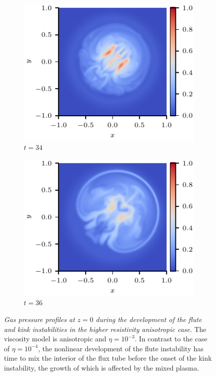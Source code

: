 \documentclass[fleqn,usenatbib]{mnras}
\newcommand{\rev}[1]{{\color{red} {#1}}}
\newcommand{\mycaption}[2]{\caption[#1]{\emph{#1} #2}}
\begin{document}
\begin{figure}
\begin{subfigure}{0.32\textwidth}
      \includegraphics[width=\linewidth]{swi-3_pressure_17.pdf}
      \caption{$t=34$}
      \label{fig:swi-3_pressure_17}
    \end{subfigure}
    \hfill
    \begin{subfigure}{0.32\textwidth}
      \includegraphics[width=\linewidth]{swi-3_pressure_18.pdf}
      \caption{$t=36$}
      \label{fig:swi-3_pressure_18}
    \end{subfigure}
\mycaption{\rev{Gas pressure} profiles at $z=0$ during the development of the flute and
kink instabilities in the higher resistivity anisotropic case.}{The viscosity
model is anisotropic and $\eta = 10^{-3}$. In contrast to the case of
$\eta=10^{-4}$, the nonlinear development of the flute instability has time to
mix the interior of the flux tube before the onset of the kink instability, the
growth of which is affected by the mixed plasma.}
\label{fig:kink_pressure_slices-3}%
\end{figure}
\end{document}
